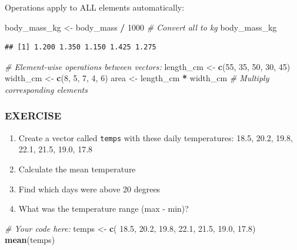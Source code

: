 \documentclass[
]{article}
\newenvironment{Shaded}{\begin{snugshade}}{\end{snugshade}}
\newcommand{\CommentTok}[1]{\textcolor[rgb]{0.56,0.35,0.01}{\textit{#1}}}
\newcommand{\DecValTok}[1]{\textcolor[rgb]{0.00,0.00,0.81}{#1}}
\newcommand{\FloatTok}[1]{\textcolor[rgb]{0.00,0.00,0.81}{#1}}
\newcommand{\FunctionTok}[1]{\textcolor[rgb]{0.13,0.29,0.53}{\textbf{#1}}}
\newcommand{\NormalTok}[1]{#1}
\newcommand{\OtherTok}[1]{\textcolor[rgb]{0.56,0.35,0.01}{#1}}
\newcommand{\SpecialCharTok}[1]{\textcolor[rgb]{0.81,0.36,0.00}{\textbf{#1}}}
\providecommand{\tightlist}{%
  \setlength{\itemsep}{0pt}\setlength{\parskip}{0pt}}
\begin{document}
Operations apply to ALL elements automatically:

\begin{Shaded}
\begin{Highlighting}[]
\NormalTok{body\_mass\_kg }\OtherTok{\textless{}{-}}\NormalTok{ body\_mass }\SpecialCharTok{/} \DecValTok{1000}     \CommentTok{\# Convert all to kg}
\NormalTok{body\_mass\_kg}
\end{Highlighting}
\end{Shaded}

\begin{verbatim}
## [1] 1.200 1.350 1.150 1.425 1.275
\end{verbatim}

\begin{Shaded}
\begin{Highlighting}[]
\CommentTok{\# Element{-}wise operations between vectors:}
\NormalTok{length\_cm }\OtherTok{\textless{}{-}} \FunctionTok{c}\NormalTok{(}\DecValTok{55}\NormalTok{, }\DecValTok{35}\NormalTok{, }\DecValTok{50}\NormalTok{, }\DecValTok{30}\NormalTok{, }\DecValTok{45}\NormalTok{)}
\NormalTok{width\_cm }\OtherTok{\textless{}{-}} \FunctionTok{c}\NormalTok{(}\DecValTok{8}\NormalTok{, }\DecValTok{5}\NormalTok{, }\DecValTok{7}\NormalTok{, }\DecValTok{4}\NormalTok{, }\DecValTok{6}\NormalTok{)}
\NormalTok{area }\OtherTok{\textless{}{-}}\NormalTok{ length\_cm }\SpecialCharTok{*}\NormalTok{ width\_cm         }\CommentTok{\# Multiply corresponding elements}
\end{Highlighting}
\end{Shaded}

\subsubsection{EXERCISE}\label{exercise-3}

\begin{enumerate}
\def\labelenumi{\arabic{enumi}.}
\tightlist
\item
  Create a vector called \texttt{temps} with these daily temperatures:
  18.5, 20.2, 19.8, 22.1, 21.5, 19.0, 17.8
\item
  Calculate the mean temperature
\item
  Find which days were above 20 degrees
\item
  What was the temperature range (max - min)?
\end{enumerate}

\begin{Shaded}
\begin{Highlighting}[]
\CommentTok{\# Your code here:}
\NormalTok{temps }\OtherTok{\textless{}{-}} \FunctionTok{c}\NormalTok{( }\FloatTok{18.5}\NormalTok{, }\FloatTok{20.2}\NormalTok{, }\FloatTok{19.8}\NormalTok{, }\FloatTok{22.1}\NormalTok{, }\FloatTok{21.5}\NormalTok{, }\FloatTok{19.0}\NormalTok{, }\FloatTok{17.8}\NormalTok{)}
\FunctionTok{mean}\NormalTok{(temps)}
\end{Highlighting}
\end{Shaded}
\end{document}

